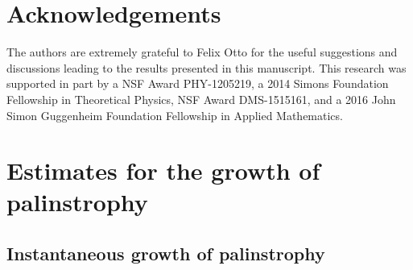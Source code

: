 \documentclass[11pt]{article}
\begin{document}
\section*{Acknowledgements}

The authors are extremely grateful to Felix Otto for the useful suggestions and discussions leading to the results presented in this manuscript.
This research was supported in part by a NSF Award PHY-1205219, a 2014 Simons Foundation Fellowship in Theoretical Physics, NSF Award DMS-1515161, and a 2016 John Simon Guggenheim Foundation Fellowship in Applied Mathematics.

\appendix

\section{Estimates for the growth of palinstrophy}
\label{sec:Analytic_Estimates}

\subsection{Instantaneous growth of palinstrophy}
\label{sec:dPdt_Estimate}
\end{document}
